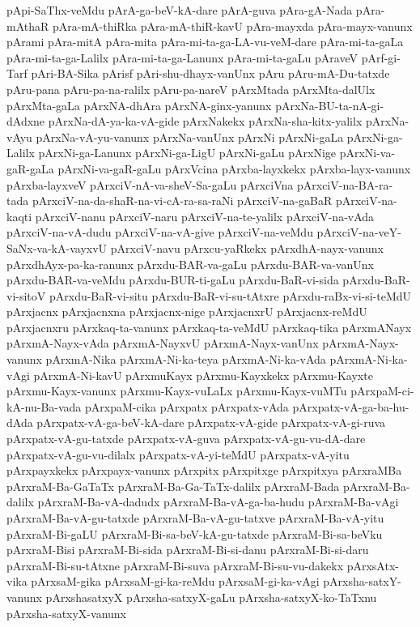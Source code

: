 {pApi-SaThx-veMdu
pArA-ga-beV-kA-dare
pArA-guva
pAra-gA-Nada
pAra-mAthaR
pAra-mA-thiRka
pAra-mA-thiR-kavU
pAra-mayxda
pAra-mayx-vanunx
pArami
pAra-mitA
pAra-mita
pAra-mi-ta-ga-LA-vu-veM-dare
pAra-mi-ta-gaLa
pAra-mi-ta-ga-Lalilx
pAra-mi-ta-ga-Lanunx
pAra-mi-ta-gaLu
pAraveV
pArf-gi-Tarf
pAri-BA-Sika
pArisf
pAri-shu-dhayx-vanUnx
pAru
pAru-mA-Du-tatxde
pAru-pana
pAru-pa-na-ralilx
pAru-pa-nareV
pArxMtada
pArxMta-dalUlx
pArxMta-gaLa
pArxNA-dhAra
pArxNA-ginx-yanunx
pArxNa-BU-ta-nA-gi-dAdxne
pArxNa-dA-ya-ka-vA-gide
pArxNakekx
pArxNa-sha-kitx-yalilx
pArxNa-vAyu
pArxNa-vA-yu-vanunx
pArxNa-vanUnx
pArxNi
pArxNi-gaLa
pArxNi-ga-Lalilx
pArxNi-ga-Lanunx
pArxNi-ga-LigU
pArxNi-gaLu
pArxNige
pArxNi-va-gaR-gaLa
pArxNi-va-gaR-gaLu
pArxVcina
pArxba-layxkekx
pArxba-layx-vanunx
pArxba-layxveV
pArxciV-nA-va-sheV-Sa-gaLu
pArxciVna
pArxciV-na-BA-ra-tada
pArxciV-na-da-shaR-na-vi-cA-ra-sa-raNi
pArxciV-na-gaBaR
pArxciV-na-kaqti
pArxciV-nanu
pArxciV-naru
pArxciV-na-te-yalilx
pArxciV-na-vAda
pArxciV-na-vA-dudu
pArxciV-na-vA-give
pArxciV-na-veMdu
pArxciV-na-veY-SaNx-va-kA-vayxvU
pArxciV-navu
pArxcu-yaRkekx
pArxdhA-nayx-vanunx
pArxdhAyx-pa-ka-ranunx
pArxdu-BAR-va-gaLu
pArxdu-BAR-va-vanUnx
pArxdu-BAR-va-veMdu
pArxdu-BUR-ti-gaLu
pArxdu-BaR-vi-sida
pArxdu-BaR-vi-sitoV
pArxdu-BaR-vi-situ
pArxdu-BaR-vi-su-tAtxre
pArxdu-raBx-vi-si-teMdU
pArxjacnx
pArxjacnxna
pArxjacnx-nige
pArxjacnxrU
pArxjacnx-reMdU
pArxjacnxru
pArxkaq-ta-vanunx
pArxkaq-ta-veMdU
pArxkaq-tika
pArxmANayx
pArxmA-Nayx-vAda
pArxmA-NayxvU
pArxmA-Nayx-vanUnx
pArxmA-Nayx-vanunx
pArxmA-Nika
pArxmA-Ni-ka-teya
pArxmA-Ni-ka-vAda
pArxmA-Ni-ka-vAgi
pArxmA-Ni-kavU
pArxmuKayx
pArxmu-Kayxkekx
pArxmu-Kayxte
pArxmu-Kayx-vanunx
pArxmu-Kayx-vuLaLx
pArxmu-Kayx-vuMTu
pArxpaM-ci-kA-nu-Ba-vada
pArxpaM-cika
pArxpatx
pArxpatx-vAda
pArxpatx-vA-ga-ba-hu-dAda
pArxpatx-vA-ga-beV-kA-dare
pArxpatx-vA-gide
pArxpatx-vA-gi-ruva
pArxpatx-vA-gu-tatxde
pArxpatx-vA-guva
pArxpatx-vA-gu-vu-dA-dare
pArxpatx-vA-gu-vu-dilalx
pArxpatx-vA-yi-teMdU
pArxpatx-vA-yitu
pArxpayxkekx
pArxpayx-vanunx
pArxpitx
pArxpitxge
pArxpitxya
pArxraMBa
pArxraM-Ba-GaTaTx
pArxraM-Ba-Ga-TaTx-dalilx
pArxraM-Bada
pArxraM-Ba-dalilx
pArxraM-Ba-vA-dadudx
pArxraM-Ba-vA-ga-ba-hudu
pArxraM-Ba-vAgi
pArxraM-Ba-vA-gu-tatxde
pArxraM-Ba-vA-gu-tatxve
pArxraM-Ba-vA-yitu
pArxraM-Bi-gaLU
pArxraM-Bi-sa-beV-kA-gu-tatxde
pArxraM-Bi-sa-beVku
pArxraM-Bisi
pArxraM-Bi-sida
pArxraM-Bi-si-danu
pArxraM-Bi-si-daru
pArxraM-Bi-su-tAtxne
pArxraM-Bi-suva
pArxraM-Bi-su-vu-dakekx
pArxsAtx-vika
pArxsaM-gika
pArxsaM-gi-ka-reMdu
pArxsaM-gi-ka-vAgi
pArxsha-satxY-vanunx
pArxshasatxyX
pArxsha-satxyX-gaLu
pArxsha-satxyX-ko-TaTxnu
pArxsha-satxyX-vanunx
}
